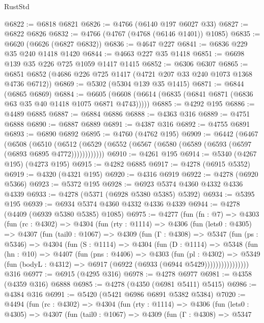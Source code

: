 \begin{lexlean}{RustStd}
\begin{coremodule}
@6822 := @6818 @6821
@6826 := @4766 (@6140 @197 @6027 @33)
@6827 := @6822 @6826
@6832 := @4766 (@4767 (@4768 (@6146 @1401)) @1085)
@6835 := @6620 (@6626 (@6827 @6832))
@6836 := @4647 @227
@6841 := @6836 @229 @35 @240 @1418 @1420
@6844 := @4663 @227 @35 @1418
@6851 := @6698 @139 @35 @226 @725 @1059 @1417 @1415
@6852 := @6306 @6307
@6865 := @6851 @6852 (@4686 @226 @725 @1417 (@4721 @207 @33 @240 @1073 @1368 @4736 @6712))
@6869 := @5302 (@5304 @139 @35 @1415)
@6871 := @6844 (@6865 @6869)
@6884 := @6605 (@6608 (@6614 (@6835 (@6841 @6871 (@6836 @63 @35 @40 @1418 @1075 @6871 @4743)))))
@6885 := @4292 @195
@6886 := @4489 @6885
@6887 := @6884 @6886
@6888 := @4363 @316
@6889 := @4751 @6888
@6890 := @6887 @6889
@6891 := @4387 @316
@6892 := @4755 @6891
@6893 := @6890 @6892
@6895 := @4760 (@4762 @195)
@6909 := @6442
    (@6467
      (@6508
        (@6510
          (@6512 (@6529 (@6552 (@6567 (@6580 (@6589 (@6593 (@6597 (@6893 @6895 @4772))))))))))))
@6910 := @4261 @195
@6914 := @5340 (@4267 @195) (@4273 @195)
@6915 := @4282 @6885
@6917 := @4278 (@6915 @5352)
@6919 := @4320 (@4321 @195)
@6920 := @4316 @6919
@6922 := @4278 (@6920 @5366)
@6923 := @5372 @195
@6928 := @6923 @5374 @4360 @4332 @4336 @4339
@6933 := @4278 (@5371 (@6928 @5380 @5385) @5392)
@6934 := @5395 @195
@6939 := @6934 @5374 @4360 @4332 @4336 @4339
@6944 := @4278 (@4409 (@6939 @5380 @5385) @1085)
@6975 := @4277
    (fun (fn : @7) =>
    @4303
      (fun (rc : @4302) =>
      @4304
        (fun (rty : @1114) =>
        @4306
          (fun (lets0 : @4305) =>
          @4307
            (fun (tail0 : @1067) =>
            @4309
              (fun (Γ : @4308) =>
              @5347
                (fun (ps : @5346) =>
                @4304
                  (fun (S : @1114) =>
                  @4304
                    (fun (D : @1114) =>
                    @5348
                      (fun (hn : @10) =>
                      @4407
                        (fun (pns : @4406) =>
                        @4303
                          (fun (pl : @4302) =>
                          @5349
                            (fun (bodyL : @4312) => @6917 (@6922 (@6933 (@6944 @5429))))))))))))))))
    @316
@6977 := @6915 (@4295 @316)
@6978 := @4278 @6977
@6981 := @4358 (@4359 @316) @6888
@6985 := @4278 (@4350 (@6981 @5411) @5415)
@6986 := @4384 @316
@6991 := @5420 (@5421 @6986 @6891 @5382 @5384)
@7020 := @4494
    (fun (rc : @4302) =>
    @4304
      (fun (rty : @1114) =>
      @4306
        (fun (lets0 : @4305) =>
        @4307
          (fun (tail0 : @1067) =>
          @4309
            (fun (Γ : @4308) =>
            @5347

\end{coremodule}
\end{lexlean}
